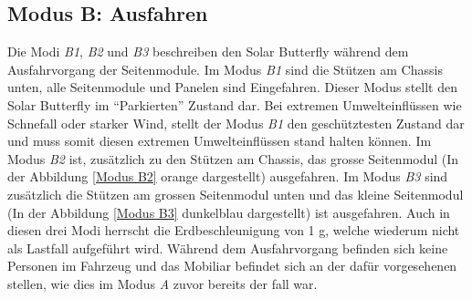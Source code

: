 
\subsection{Modus B: Ausfahren}
Die Modi \emph{B1}, \emph{B2} und \emph{B3} beschreiben den Solar Butterfly während dem Ausfahrvorgang der Seitenmodule. Im Modus \emph{B1} sind die Stützen am Chassis unten, alle Seitenmodule und Panelen sind Eingefahren. Dieser Modus stellt den Solar Butterfly im ``Parkierten'' Zustand dar. Bei extremen Umwelteinflüssen wie Schnefall oder starker Wind, stellt der Modus \emph{B1} den geschütztesten Zustand dar und muss somit diesen extremen Umwelteinflüssen stand halten können. Im Modus \emph{B2} ist, zusätzlich zu den Stützen am Chassis, das grosse Seitenmodul (In der Abbildung \ref{Modus B2} orange dargestellt) ausgefahren. Im Modus \emph{B3} sind zusätzlich die Stützen am grossen Seitenmodul unten und das kleine Seitenmodul (In der Abbildung \ref{Modus B3} dunkelblau dargestellt) ist ausgefahren.
Auch in diesen drei Modi herrscht die Erdbeschleunigung von 1 g, welche wiederum nicht als Lastfall aufgeführt wird. Während dem Ausfahrvorgang befinden sich keine Personen im Fahrzeug und das Mobiliar befindet sich an der dafür vorgesehenen stellen, wie dies im Modus \emph{A} zuvor bereits der fall war.

